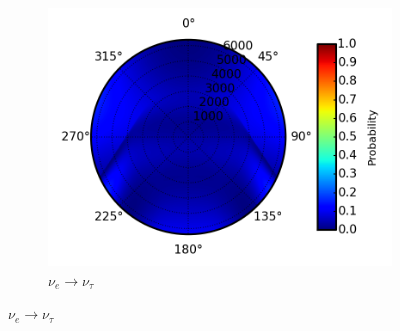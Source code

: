 \documentclass{beamer}
\begin{document}
\begin{frame}
\begin{figure}
\begin{subfigure}[b]{0.33\linewidth}
			\caption{ $\nu_{e} \rightarrow \nu_{\tau}$ }
			\includegraphics[width=\linewidth]{earth_10.0gev_nue2nutau_throughEarth.png}
		\end{subfigure}
	\end{figure}
\end{frame}
\end{document}
